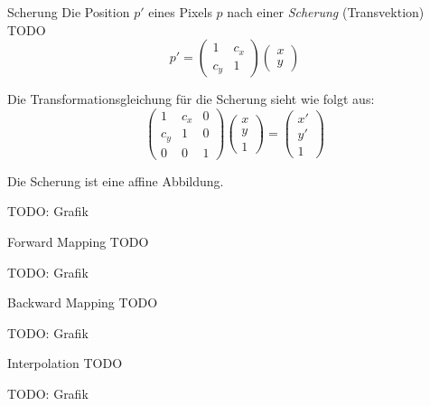 \begin{defi}{Scherung}
    Die Position $p'$ eines Pixels $p$ nach einer \emph{Scherung} (Transvektion) TODO
    \[
        p' =
        \begin{pmatrix}
            1   & c_x \\
            c_y & 1
        \end{pmatrix}
        \begin{pmatrix}
            x \\
            y
        \end{pmatrix}
    \]

    Die Transformationsgleichung für die Scherung sieht wie folgt aus:
    \[
        \begin{pmatrix}
            1   & c_x & 0 \\
            c_y & 1   & 0 \\
            0   & 0   & 1
        \end{pmatrix}
        \begin{pmatrix}
            x \\ y \\ 1
        \end{pmatrix}
        =
        \begin{pmatrix}
            x' \\ y' \\ 1
        \end{pmatrix}
    \]

    Die Scherung ist eine affine Abbildung.

    TODO: Grafik
\end{defi}

\begin{defi}[TODO]{Forward Mapping}
    TODO

    TODO: Grafik
\end{defi}

\begin{defi}[TODO]{Backward Mapping}
    TODO

    TODO: Grafik
\end{defi}

\begin{defi}[TODO]{Interpolation}
    TODO

    TODO: Grafik
\end{defi}

